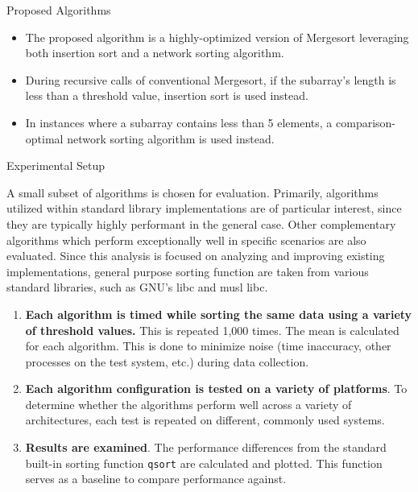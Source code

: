 \documentclass[final]{beamer}
\newlength{\colwidth}
\begin{document}
\begin{frame}[t]
\begin{columns}[t]
\begin{column}{\colwidth}
			\begin{block}{Proposed Algorithms}
				\begin{itemize}
					\item The proposed algorithm is a highly-optimized version of
					      Mergesort leveraging both insertion sort and a network
					      sorting algorithm.
					\item During recursive calls of conventional Mergesort, if the
					      subarray's length is less than a threshold value,
					      insertion sort is used instead.
					\item In instances where a subarray contains less than 5
					      elements, a comparison-optimal network sorting algorithm
					      is used instead.
				\end{itemize}
			\end{block}

			\begin{block}{Experimental Setup}

				A small subset of algorithms is chosen for evaluation. Primarily,
				algorithms utilized within standard library implementations are of
				particular interest, since they are typically highly performant in
				the general case. Other complementary algorithms which perform
				exceptionally well in specific scenarios are also evaluated. Since
				this analysis is focused on analyzing and improving existing
				implementations, general purpose sorting function are taken from
				various standard libraries, such as GNU's libc\parencite{glibc}
				and musl libc\parencite{musl_libc}.

				\begin{enumerate}
					\item \textbf{Each algorithm is timed while sorting the same
						      data using a variety of threshold values.} This is
					      repeated 1,000 times. The mean is calculated for each
					      algorithm. This is done to minimize noise (time
					      inaccuracy, other processes on the test system, etc.)
					      during data collection.
					\item \textbf{Each algorithm configuration is tested on a
						      variety of platforms}. To determine whether the
					      algorithms perform well across a variety of
					      architectures, each test is repeated on different,
					      commonly used systems.
					\item \textbf{Results are examined}. The performance
					      differences from the standard built-in sorting function
					      \texttt{qsort} are calculated and plotted. This function
					      serves as a baseline to compare performance against.
				\end{enumerate}
			\end{block}
		\end{column}


\end{columns}
\end{frame}
\end{document}
